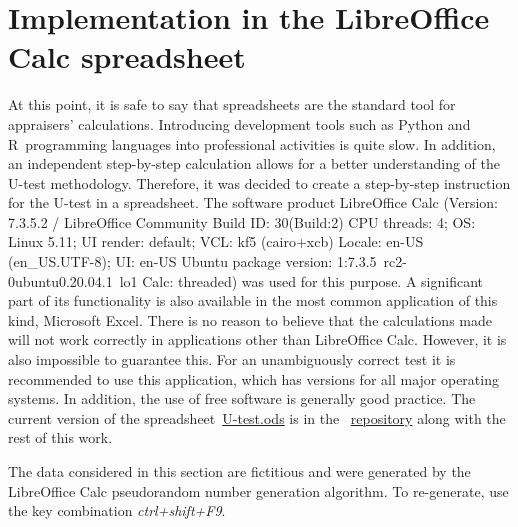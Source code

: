 \documentclass[]{scrreprt}
\begin{document}
\section{Implementation in the LibreOffice Calc spreadsheet}\label{U-test-spreadsheet}
At this point, it is safe to say that spreadsheets are the standard tool for appraisers' calculations. Introducing development tools such as Python and R~programming languages into professional activities is quite slow. In addition, an independent step-by-step calculation allows for a better understanding of the U-test methodology. Therefore, it was decided to create a step-by-step instruction for the U-test in a spreadsheet. The software product LibreOffice Calc (Version: 7.3.5.2 / LibreOffice Community
Build ID: 30(Build:2) CPU threads: 4; OS: Linux 5.11; UI render: default; VCL: kf5 (cairo+xcb)
Locale: en-US (en\_US.UTF-8); UI: en-US Ubuntu package version: 1:7.3.5~rc2-0ubuntu0.20.04.1~lo1
Calc: threaded) was used for this purpose. A significant part of its functionality is also available in the most common application of this kind, Microsoft Excel. There is no reason to believe that the calculations made will not work correctly in applications other than LibreOffice Calc. However, it is also impossible to guarantee this. For an unambiguously correct test it is recommended to use this application, which has versions for all major operating systems. In addition, the use of free software is generally good practice. The current version of the spreadsheet~\href{https://github.com/Kirill-Murashev/AI_for_valuers_book/blob/main/Parts-Chapters/Mann-Whitney-Wilcoxon/U-test.ods}{U-test.ods} is in the ~\href{https://github.com/Kirill-Murashev/AI_for_valuers_book/tree/main/Parts&Chapters/Mann-Whitney-Wilcoxon}{repository} along with the rest of this work.

The data considered in this section are fictitious and were generated by the LibreOffice Calc pseudorandom number generation algorithm. To re-generate, use the key combination \emph{ctrl+shift+F9}.
\end{document}
